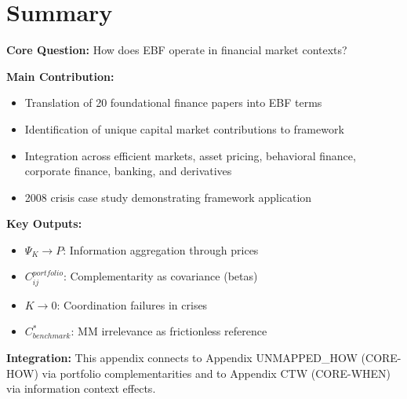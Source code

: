 %
%

\section{Summary}
\label{sec:Y-summary}

\begin{tcolorbox}[colback=green!10!white, colframe=green!75!black,
    title=\textbf{Appendix UNMAPPED_CIA: Summary}]

\textbf{Core Question:} How does EBF operate in financial market contexts?

\textbf{Main Contribution:}
\begin{itemize}[nosep]
    \item Translation of 20 foundational finance papers into EBF terms
    \item Identification of unique capital market contributions to framework
    \item Integration across efficient markets, asset pricing, behavioral finance,
          corporate finance, banking, and derivatives
    \item 2008 crisis case study demonstrating framework application
\end{itemize}

\textbf{Key Outputs:}
\begin{itemize}[nosep]
    \item $\Psi_K \to P$: Information aggregation through prices
    \item $C_{ij}^{portfolio}$: Complementarity as covariance (betas)
    \item $K \to 0$: Coordination failures in crises
    \item $C^*_{benchmark}$: MM irrelevance as frictionless reference
\end{itemize}

\textbf{Integration:} This appendix connects to Appendix UNMAPPED_HOW (CORE-HOW) via
portfolio complementarities and to Appendix CTW (CORE-WHEN) via information
context effects.

\end{tcolorbox}


